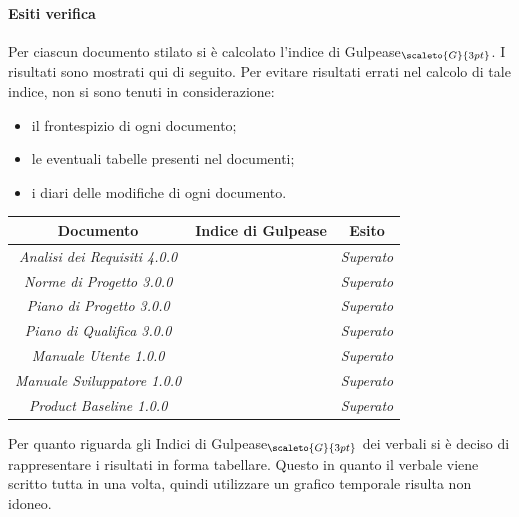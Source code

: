 {{{{\paragraph{Esiti verifica}\label{ResocontoAttivitàDiVerificaRevisioneDiQualificaVerificheDiProdottoStrategiaAdoperataPerLAnalisiStaticaDeiDocumentiEsitiDiVerifica}
Per ciascun documento stilato si è calcolato l’indice di Gulpease$_{\scaleto{G}{3pt}}$. I risultati sono mostrati qui di seguito.
Per evitare risultati errati nel calcolo di tale indice, non si sono tenuti in considerazione:
\begin{itemize}
	\item il frontespizio di ogni documento;
	\item le eventuali tabelle presenti nel documenti;
	\item i diari delle modifiche di ogni documento.
\end{itemize}
\quad
\def\tabularxcolumn#1{m{#1}}
{
	\begin{center}
		\renewcommand{\arraystretch}{1.4}
		\begin{tabularx}{11,70cm}{|c|c|c|}
			\hline
			\rowcolor{airforceblue}
			\textbf{Documento} & \textbf{Indice di Gulpease} & \textbf{Esito}\\
			\hline
			\textit{Analisi dei Requisiti 4.0.0} &  & \textit{Superato}\\
			\hline
			\textit{Norme di Progetto 3.0.0} & & \textit{Superato}\\
			\hline
			\textit{Piano di Progetto 3.0.0} &  & \textit{Superato}\\
			\hline
			\textit{Piano di Qualifica 3.0.0} &  & \textit{Superato}\\
			\hline
			\textit{Manuale Utente 1.0.0} & & \textit{Superato}\\
			\hline
			\textit{Manuale Sviluppatore 1.0.0} & & \textit{Superato}\\
			\hline
			\textit{Product Baseline 1.0.0} & & \textit{Superato}\\
			\hline
		\end{tabularx}
	\end{center}

Per quanto riguarda gli Indici di Gulpease$_{\scaleto{G}{3pt}}$ dei verbali si è deciso di rappresentare i risultati in forma tabellare.
Questo in quanto il verbale viene scritto tutta in una volta, quindi utilizzare un grafico temporale risulta non idoneo.

}}}}}
